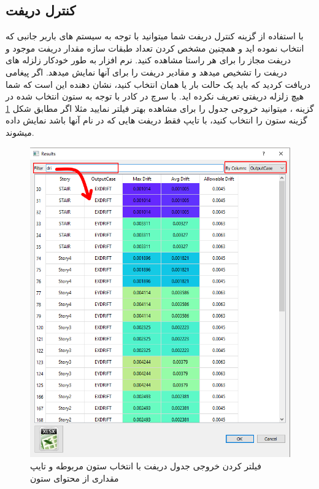 \subsection{کنترل دریفت}
با استفاده از گزینه کنترل دریفت شما میتوانید با توجه به سیستم های باربر جانبی که انتخاب نموده اید و همچنین مشخص کردن تعداد طبقات سازه مقدار دریفت موجود و دریفت مجاز را برای هر راستا مشاهده کنید.
نرم افزار به طور خودکار زلزله های دریفت را تشخیص میدهد و مقادیر دریفت را برای آنها نمایش میدهد.  اگر پیغامی دریافت کردید که باید یک حالت بار یا همان 
انتخاب کنید، نشان دهنده این است که شما هیچ زلزله دریفتی تعریف نکرده اید.
با سرچ در کادر 
با توجه به ستون انتخاب شده در گزینه 
، میتوانید خروجی جدول را برای مشاهده بهتر فیلتر نمایید مثلا اگر مطابق شکل
\ref{pic:drift}
گزینه ستون را
انتخاب کنید، با تایپ 
فقط دریفت هایی که در نام آنها  باشد نمایش داده میشوند.

\begin{figure}[H]
   \centering
   \includegraphics[scale=0.7]{figures/drift}
   \caption{فیلتر کردن خروجی جدول دریفت با انتخاب ستون مربوطه و تایپ  مقداری از محتوای ستون}
   \label{pic:drift}
\end{figure}

